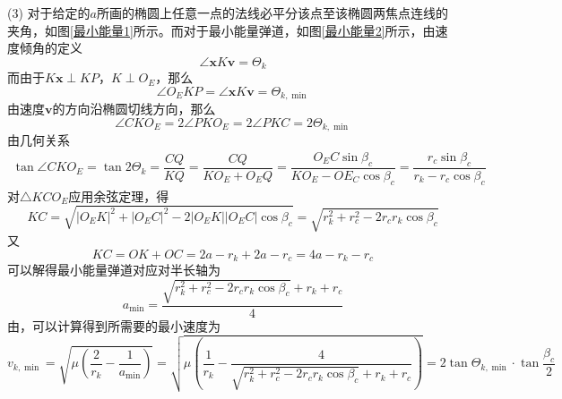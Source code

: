 (3) \hspace*{0.5em} 对于给定的$a$所画的椭圆上任意一点的法线必平分该点至该椭圆两焦点连线的夹角，如图\ref{最小能量1}所示。而对于最小能量弹道，如图\ref{最小能量2}所示，由速度倾角的定义
\begin{equation}
	\angle \bm{x}K\bm{v} = \varTheta_k
\end{equation}
而由于$K\bm{x} \perp KP$，$K \perp O_E$，那么
\begin{equation}
	\angle O_E K P = \angle \bm{x}K\bm{v} = \varTheta_{k, \min}
\end{equation}
由速度$\bm{v}$的方向沿椭圆切线方向，那么
\begin{equation}
	\angle C K O_E = 2 \angle P K O_E = 2 \angle PKC = 2 \varTheta_{k, \min}
\end{equation}
由几何关系
\begin{equation}
	\begin{split}
		\tan \angle CKO_E = \tan 2\varTheta_k = \dfrac{CQ}{KQ} = \dfrac{CQ}{KO_E + O_EQ} = \dfrac{O_EC \sin \beta_c}{KO_E - OE_C \cos \beta_c} = \dfrac{r_c \sin \beta_c}{r_k - r_c \cos \beta_c}
	\end{split}
\end{equation}
对$\triangle KCO_E$应用余弦定理，得
\begin{equation}
	KC = \sqrt{\left|O_EK\right|^2 + \left|O_EC\right|^2 - 2\left|O_EK\right|\left|O_EC\right|\cos \beta_c} = \sqrt{r_k^2 + r_c^2 - 2r_cr_k\cos \beta_c}
\end{equation}
又
\begin{equation}
	KC = OK + OC = 2a - r_k + 2a - r_c = 4a - r_k - r_c
\end{equation}
可以解得最小能量弹道对应对半长轴为
\begin{equation}
	a_{\min} = \dfrac{\sqrt{r_k^2 + r_c^2 - 2r_cr_k\cos \beta_c} + r_k + r_c}{4}
\end{equation}
由\peref[活力公式]，可以计算得到所需要的最小速度为
\begin{equation}
	v_{k,\min} = \sqrt{\mu \left(\dfrac{2}{r_k} - \dfrac{1}{a_{\min}}\right)} = \sqrt{\mu \left(\dfrac{1}{r_k} - \dfrac{4}{\sqrt{r_k^2 + r_c^2 - 2r_cr_k\cos \beta_c} + r_k + r_c}\right)} = 2 \tan \varTheta_{k, \min} \cdot \tan \dfrac{\beta_c}{2}
\end{equation}

